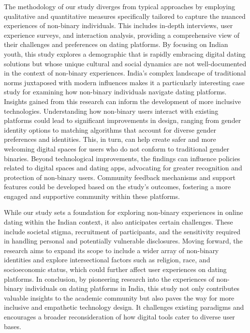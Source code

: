 The methodology of our study diverges from typical approaches by employing qualitative and quantitative measures specifically tailored to capture the nuanced experiences of non-binary individuals. This includes in-depth interviews, user experience surveys, and interaction analysis, providing a comprehensive view of their challenges and preferences on dating platforms. By focusing on Indian youth, this study explores a demographic that is rapidly embracing digital dating solutions but whose unique cultural and social dynamics are not well-documented in the context of non-binary experiences. India's complex landscape of traditional norms juxtaposed with modern influences makes it a particularly interesting case study for examining how non-binary individuals navigate dating platforms. Insights gained from this research can inform the development of more inclusive technologies. Understanding how non-binary users interact with existing platforms could lead to significant improvements in design, ranging from gender identity options to matching algorithms that account for diverse gender preferences and identities. This, in turn, can help create safer and more welcoming digital spaces for users who do not conform to traditional gender binaries. Beyond technological improvements, the findings can influence policies related to digital spaces and dating apps, advocating for greater recognition and protection of non-binary users. Community feedback mechanisms and support features could be developed based on the study's outcomes, fostering a more engaged and supportive community within these platforms.

While our study sets a foundation for exploring non-binary experiences in online dating within the Indian context, it also anticipates certain challenges. These include societal stigma, recruitment of participants, and the sensitivity required in handling personal and potentially vulnerable disclosures. Moving forward, the research aims to expand its scope to include a wider array of non-binary identities and explore intersectional factors such as religion, race, and socioeconomic status, which could further affect user experiences on dating platforms. In conclusion, by pioneering research into the experiences of non-binary individuals on dating platforms in India, this study not only contributes valuable insights to the academic community but also paves the way for more inclusive and empathetic technology design. It challenges existing paradigms and encourages a broader reconsideration of how digital tools cater to diverse user bases.

